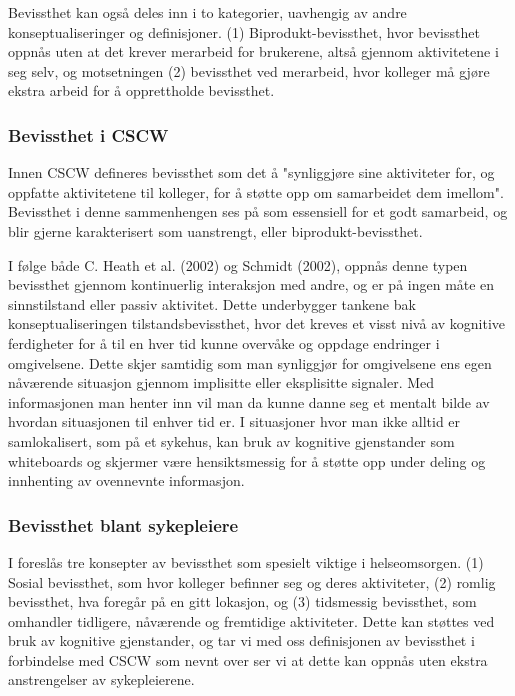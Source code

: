 \noindent
Bevissthet kan også deles inn i to kategorier, uavhengig av andre konseptualiseringer og definisjoner. (1) Biprodukt-bevissthet, hvor bevissthet oppnås uten at det krever merarbeid for brukerene, altså gjennom aktivitetene i seg selv, og motsetningen (2) bevissthet ved merarbeid, hvor kolleger må gjøre ekstra arbeid for å opprettholde bevissthet\cite{Randell}. 


\subsubsection{Bevissthet i CSCW}
Innen CSCW defineres bevissthet som det å "synliggjøre sine aktiviteter for, og oppfatte aktivitetene til kolleger, for å støtte opp om samarbeidet dem imellom". Bevissthet i denne sammenhengen ses på som essensiell for et godt samarbeid, og blir gjerne karakterisert som uanstrengt, eller biprodukt-bevissthet\cite{Randell}. 

\noindent
I følge både C. Heath et al. (2002) og Schmidt (2002), oppnås denne typen bevissthet gjennom kontinuerlig interaksjon med andre, og er på ingen måte en sinnstilstand eller passiv aktivitet. Dette underbygger tankene bak konseptualiseringen tilstandsbevissthet, hvor det kreves et visst nivå av kognitive ferdigheter for å til en hver tid kunne overvåke og oppdage endringer i omgivelsene. Dette skjer samtidig som man synliggjør for omgivelsene ens egen nåværende situasjon gjennom implisitte eller eksplisitte signaler. Med informasjonen man henter inn vil man da kunne danne seg et mentalt bilde av hvordan situasjonen til enhver tid er. I situasjoner hvor man ikke alltid er samlokalisert, som på et sykehus, kan bruk av kognitive gjenstander som whiteboards og skjermer være hensiktsmessig for å støtte opp under deling og innhenting av ovennevnte informasjon\cite{Bardram04}. 

\subsubsection{Bevissthet blant sykepleiere}
I \cite{Randell} foreslås tre konsepter av bevissthet som spesielt viktige i helseomsorgen. (1) Sosial bevissthet, som hvor kolleger befinner seg og deres aktiviteter, (2) romlig bevissthet, hva foregår på en gitt lokasjon, og (3) tidsmessig bevissthet, som omhandler tidligere, nåværende og fremtidige aktiviteter. 
Dette kan støttes ved bruk av kognitive gjenstander, og tar vi med oss definisjonen av bevissthet i forbindelse med CSCW som nevnt over ser vi at dette kan oppnås uten ekstra anstrengelser av sykepleierene.


